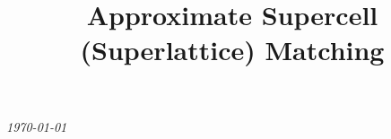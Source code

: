 \documentclass[preprint]{iucr}              %
\numberwithin{equation}{section}
\begin{document}
	
	
	
	
	
	
	
	
	
	
	
	\begin{center}
	{\LARGE \emph{\today}} \\
\end{center}

\title{Approximate Supercell (Superlattice) Matching}

\end{document}
